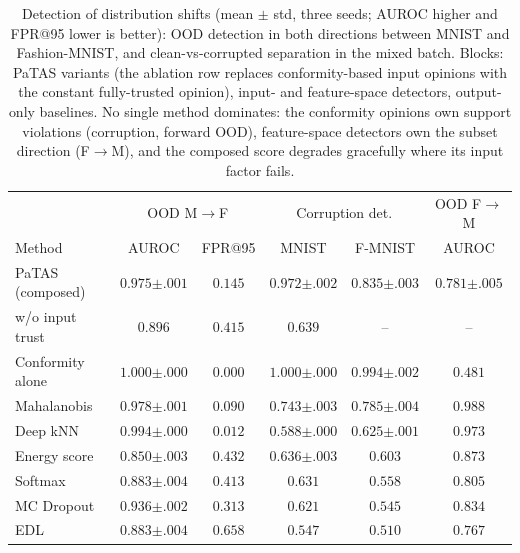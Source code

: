 \begin{table}[ht]
\centering\footnotesize
\setlength{\tabcolsep}{3.5pt}
\begin{tabular}{lccccc}
\toprule
 & \multicolumn{2}{c}{OOD M$\to$F} & \multicolumn{2}{c}{Corruption det.} & OOD F$\to$M \\
Method & AUROC & FPR@95 & MNIST & F-MNIST & AUROC \\
\midrule
PaTAS (composed) & $0.975{\scriptstyle\pm.001}$ & $0.145$ & $0.972{\scriptstyle\pm.002}$ & $0.835{\scriptstyle\pm.003}$ & $0.781{\scriptstyle\pm.005}$ \\
\;\;w/o input trust & $0.896$ & $0.415$ & $0.639$ & -- & -- \\
Conformity alone & $\mathbf{1.000}{\scriptstyle\pm.000}$ & $\mathbf{0.000}$ & $\mathbf{1.000}{\scriptstyle\pm.000}$ & $\mathbf{0.994}{\scriptstyle\pm.002}$ & $0.481$ \\
\midrule
Mahalanobis & $0.978{\scriptstyle\pm.001}$ & $0.090$ & $0.743{\scriptstyle\pm.003}$ & $0.785{\scriptstyle\pm.004}$ & $\mathbf{0.988}$ \\
Deep kNN & $0.994{\scriptstyle\pm.000}$ & $0.012$ & $0.588{\scriptstyle\pm.000}$ & $0.625{\scriptstyle\pm.001}$ & $0.973$ \\
Energy score & $0.850{\scriptstyle\pm.003}$ & $0.432$ & $0.636{\scriptstyle\pm.003}$ & $0.603$ & $0.873$ \\
\midrule
Softmax & $0.883{\scriptstyle\pm.004}$ & $0.413$ & $0.631$ & $0.558$ & $0.805$ \\
MC Dropout & $0.936{\scriptstyle\pm.002}$ & $0.313$ & $0.621$ & $0.545$ & $0.834$ \\
EDL & $0.883{\scriptstyle\pm.004}$ & $0.658$ & $0.547$ & $0.510$ & $0.767$ \\
\bottomrule
\end{tabular}
\caption{Detection of distribution shifts (mean $\pm$ std, three seeds; AUROC higher and FPR@95 lower is better): OOD detection in both directions between MNIST and Fashion-MNIST, and clean-vs-corrupted separation in the mixed batch. Blocks: PaTAS variants (the ablation row replaces conformity-based input opinions with the constant fully-trusted opinion), input- and feature-space detectors, output-only baselines. No single method dominates: the conformity opinions own support violations (corruption, forward OOD), feature-space detectors own the subset direction (F$\to$M), and the composed score degrades gracefully where its input factor fails.}
\label{tab:comparative}
\end{table}

